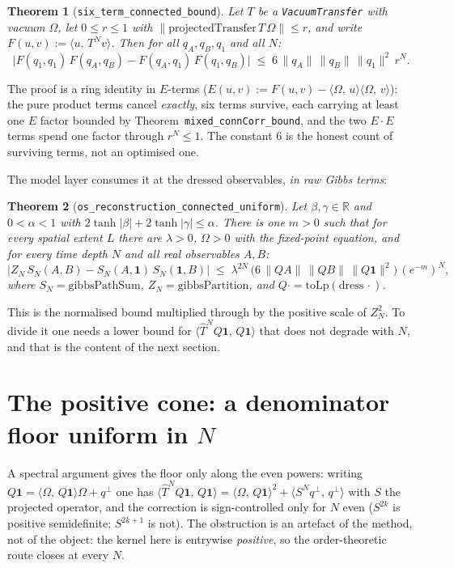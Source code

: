 \documentclass[11pt]{article}
\newtheorem{theorem}{Theorem}[section]
\newcommand{\lean}[1]{\texttt{#1}}
\newcommand{\ip}[2]{\langle #1,\,#2\rangle}
\begin{document}
\begin{theorem}[\lean{six\_term\_connected\_bound}]
Let $T$ be a \lean{VacuumTransfer} with vacuum $\Omega$, let
$0 \le r \le 1$ with
$\lVert\mathrm{projectedTransfer}\,T\,\Omega\rVert \le r$, and write
$F(u,v) := \ip{u}{T^N v}$.  Then for all $q_A, q_B, q_1$ and all $N$:
\[
\bigl| F(q_1,q_1)\,F(q_A,q_B) - F(q_A,q_1)\,F(q_1,q_B) \bigr|
\;\le\; 6\,\lVert q_A\rVert\,\lVert q_B\rVert\,\lVert q_1\rVert^2\,
r^N .
\]
\end{theorem}

The proof is a ring identity in $E$-terms
($E(u,v) := F(u,v) - \ip{\Omega}{u}\ip{\Omega}{v}$): the pure product
terms cancel \emph{exactly}, six terms survive, each carrying at least
one $E$ factor bounded by Theorem~\lean{mixed\_connCorr\_bound}, and
the two $E\!\cdot\!E$ terms spend one factor through $r^N \le 1$.  The
constant $6$ is the honest count of surviving terms, not an optimised
one.

The model layer consumes it at the dressed observables, \emph{in raw
Gibbs terms}:

\begin{theorem}[\lean{os\_reconstruction\_connected\_uniform}]
Let $\beta, \gamma \in \mathbb{R}$ and $0 < \alpha < 1$ with
$2\tanh|\beta|+2\tanh|\gamma| \le \alpha$.  There is \emph{one}
$m > 0$ such that for \emph{every} spatial extent $L$ there are
$\lambda > 0$, $\Omega > 0$ with the fixed-point equation, and for
every time depth $N$ and all real observables $A, B$:
\[
\bigl| Z_N\, S_N(A,B) - S_N(A,\mathbf 1)\, S_N(\mathbf 1,B) \bigr|
\;\le\; \lambda^{2N}\,
\bigl(6\,\lVert QA\rVert\,\lVert QB\rVert\,\lVert Q\mathbf 1\rVert^2
\bigr)\,(e^{-m})^N ,
\]
where $S_N = \mathrm{gibbsPathSum}$, $Z_N = \mathrm{gibbsPartition}$,
and $Q{\cdot} = \mathrm{toLp}(\mathrm{dress}\,{\cdot})$.
\end{theorem}

This is the normalised bound multiplied through by the positive scale
of $Z_N^2$.  To divide it one needs a lower bound for
$\ip{\hat T^N Q\mathbf 1}{Q\mathbf 1}$ that does not degrade with $N$,
and that is the content of the next section.

\section{The positive cone: a denominator floor uniform in $N$}
\label{sec:cone}
A spectral argument gives the floor only along the even powers: writing
$Q\mathbf 1 = \ip{\Omega}{Q\mathbf 1}\Omega + q^\perp$ one has
$\ip{\hat T^N Q\mathbf 1}{Q\mathbf 1}
= \ip{\Omega}{Q\mathbf 1}^2 + \ip{S^N q^\perp}{q^\perp}$ with
$S$ the projected operator, and the correction is sign-controlled only
for $N$ even ($S^{2k}$ is positive semidefinite; $S^{2k+1}$ is not).
The obstruction is an artefact of the method, not of the object: the
kernel here is entrywise \emph{positive}, so the order-theoretic route
closes at every $N$.
\end{document}
